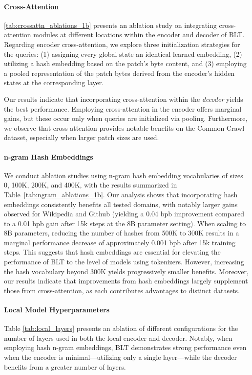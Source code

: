 \paragraph{Cross-Attention}
\autoref{tab:crossattn_ablations_1b} presents an ablation study on integrating cross-attention modules at different locations within the encoder and decoder of {\textsc BLT}. Regarding encoder cross-attention, we explore three initialization strategies for the queries: (1) assigning every global state an identical learned embedding, (2) utilizing a hash embedding based on the patch's byte content, and (3) employing a pooled representation of the patch bytes derived from the encoder's hidden states at the corresponding layer.

Our results indicate that incorporating cross-attention within the \textit{decoder} yields the best performance. Employing cross-attention in the encoder offers marginal gains, but these occur only when queries are initialized via pooling. Furthermore, we observe that cross-attention provides notable benefits on the Common-Crawl dataset, especially when larger patch sizes are used.

\paragraph{n-gram Hash Embeddings} 

We conduct ablation studies using n-gram hash embedding vocabularies of sizes 0, 100K, 200K, and 400K, with the results summarized in Table~\ref{tab:ngram_ablations_1b}. Our analysis shows that incorporating hash embeddings consistently benefits all tested domains, with notably larger gains observed for Wikipedia and Github (yielding a 0.04 bpb improvement compared to a 0.01 bpb gain after 15k steps at the 8B parameter setting). When scaling to 8B parameters, reducing the number of hashes from 500K to 300K results in a marginal performance decrease of approximately 0.001 bpb after 15k training steps. This suggests that hash embeddings are essential for elevating the performance of {\textsc BLT} to the level of models using tokenizers. However, increasing the hash vocabulary beyond 300K yields progressively smaller benefits. Moreover, our results indicate that improvements from hash embeddings largely supplement those from cross-attention, as each contributes advantages to distinct datasets.

\paragraph{Local Model Hyperparameters} Table \ref{tab:local_layers} presents an ablation of different configurations for the number of layers used in both the local encoder and decoder. Notably, when employing hash n-gram embeddings, {\textsc BLT} demonstrates strong performance even when the encoder is minimal—utilizing only a single layer—while the decoder benefits from a greater number of layers.

